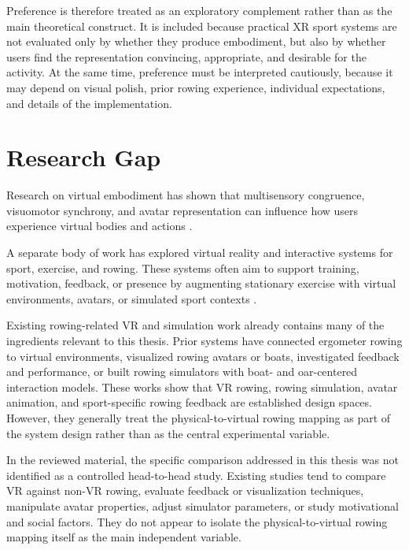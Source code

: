 Preference is therefore treated as an exploratory complement rather than as the main theoretical construct. It is included because practical XR sport systems are not evaluated only by whether they produce embodiment, but also by whether users find the representation convincing, appropriate, and desirable for the activity. At the same time, preference must be interpreted cautiously, because it may depend on visual polish, prior rowing experience, individual expectations, and details of the implementation.

\section{Research Gap}
\label{sec:introduction_research_gap}

Research on virtual embodiment has shown that multisensory congruence, visuomotor synchrony, and avatar representation can influence how users experience virtual bodies and actions \parencite{kilteniEtAl2012senseEmbodiment,kalckertEhrsson2012movingRubberHand,gonzalezFrancoPeck2018avatarEmbodiment}.

A separate body of work has explored virtual reality and interactive systems for sport, exercise, and rowing. These systems often aim to support training, motivation, feedback, or presence by augmenting stationary exercise with virtual environments, avatars, or simulated sport contexts \parencite{neumannEtAl2018interactiveVrSport,murrayEtAl2016vrRowingPresence,arndtEtAl2018vrRowingWorkouts,rauterEtAl2013rowingTransfer}.

Existing rowing-related VR and simulation work already contains many of the ingredients relevant to this thesis. Prior systems have connected ergometer rowing to virtual environments, visualized rowing avatars or boats, investigated feedback and performance, or built rowing simulators with boat- and oar-centered interaction models. These works show that VR rowing, rowing simulation, avatar animation, and sport-specific rowing feedback are established design spaces. However, they generally treat the physical-to-virtual rowing mapping as part of the system design rather than as the central experimental variable.

In the reviewed material, the specific comparison addressed in this thesis was not identified as a controlled head-to-head study. Existing studies tend to compare VR against non-VR rowing, evaluate feedback or visualization techniques, manipulate avatar properties, adjust simulator parameters, or study motivational and social factors. They do not appear to isolate the physical-to-virtual rowing mapping itself as the main independent variable.

